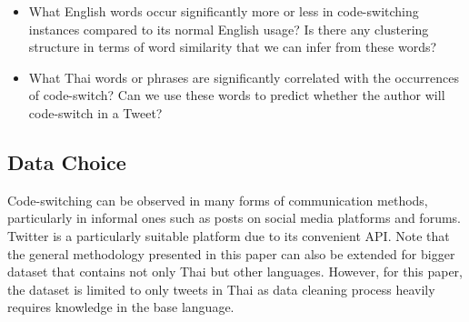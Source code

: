 \documentclass[conference]{IEEEtran}
\newcommand{\col}[1]{\textcolor{awesome}{#1}}
\begin{document}
\begin{itemize}
\item What English words occur significantly more or less in code-switching instances compared to its normal English usage? Is there any clustering structure in terms of word similarity that we can infer from these words?
\item What Thai words or phrases are significantly correlated with the occurrences of code-switch? Can we use these words to predict whether the author will code-switch in a Tweet?
\end{itemize}


\subsection{Data Choice}
Code-switching can be observed in many forms of communication methods, particularly in  informal ones such as posts on  social media platforms and forums. Twitter is a particularly suitable platform due to its convenient API. 
Note that the general methodology presented in this paper can also be extended for bigger dataset that contains not only Thai but other languages. However, for this paper, the dataset is limited to only tweets in Thai as data cleaning process heavily requires knowledge in the base language. %


\end{document}
